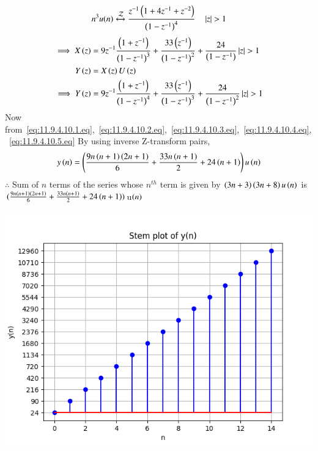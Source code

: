 \documentclass[journal,12pt,onecolumn]{IEEEtran}
\theoremstyle{remark}
\begin{document}
\begin{equation}
n^3u(n) \xleftrightarrow{\mathcal{Z}} \frac{z^{-1}\left(1+4z^{-1}+z^{-2}\right)}{\left(1-z^{-1}\right)^4} \quad \left\vert z\right\vert>1 \\ \label{eq:11.9.4.10.4.eq}
\end{equation} 
\begin{align}
            \implies X\left(z\right)&=9z^{-1}\frac{\left(1+z^{-1}\right)}{\left(1-z^{-1}\right)^3} + \frac{33\left(z^{-1}\right)}{\left(1-z^{-1}\right)^2} +\frac{24}{\left(1-z^{-1}\right)} \left\vert z\right\vert>1    \label{eq:eq5}\\
            Y\left(z\right) &= X\left(z\right)U\left(z\right) \label{eq:eq3} \\
              \implies Y\left(z\right)&= 9z^{-1}\frac{\left(1+z^{-1}\right)}{\left(1-z^{-1}\right)^4} + \frac{33\left(z^{-1}\right)}{\left(1-z^{-1}\right)^3} +\frac{24}{\left(1-z^{-1}\right)^2} \left\vert z\right\vert>1  \label{eq:11.9.4.10.5.eq}
        \end{align}
        Now from~\eqref{eq:11.9.4.10.1.eq},~\eqref{eq:11.9.4.10.2.eq},~\eqref{eq:11.9.4.10.3.eq},~\eqref{eq:11.9.4.10.4.eq},
 ~\eqref{eq:11.9.4.10.5.eq} By using  inverse Z-transform pairs,
 \begin{align}
            y\left(n\right)= \left(\frac{9n\left(n+1\right)\left(2n+1\right)}{6}+\frac{33n\left(n+1\right)}{2}+24\left(n+1\right)\right)u\left(n\right)
        \end{align}
        $\therefore$ Sum of $n$ terms of the series whose $n^{th}$ term is given by $\left(3n+3\right)\left(3n+8\right)u\left(n\right)$ is $(\frac{9n\left(n+1\right)\left(2n+1\right)}{6}+\frac{33n\left(n+1\right)}{2}+24\left(n+1\right))$u$\left(n\right)$
        \\ \\
        \includegraphics[width=\columnwidth]{figs/plot.png}
        \label{fig:Graph1_math.11.9.4.8}
        
\end{document}
